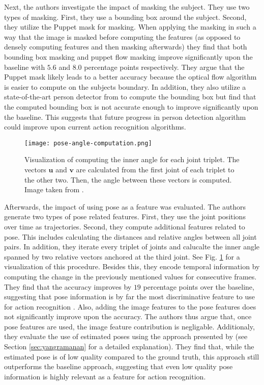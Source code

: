Next, the authors investigate the impact of masking the subject. 
They use two types of masking. First, they use a bounding box around the subject. Second, they utilize the Puppet mask for masking. 
When applying the masking in such a way that the image is masked before computing the features (as opposed to densely computing features and then masking afterwards) they find that both bounding box masking and puppet flow masking improve significantly upon the baseline with $5.6$ and $8.0$ percentage points respectively.
They argue that the Puppet mask likely leads to a better accuracy because the optical flow algorithm is easier to compute on the subjects boundary.
In addition, they also utilize a state-of-the-art person detector from \cite{bourdev_detecting_2010} to compute the bounding box but find that the computed bounding box is not accurate enough to improve significantly upon the baseline.
This suggests that future progress in person detection algorithm could improve upon current action recognition algorithms.

\begin{figure}[htb!]
    \centering
    \texttt{[image: pose-angle-computation.png]}
    \caption{Visualization of computing the inner angle for each joint triplet. The vectors $\bm{u}$ and $\bm{v}$ are calculated from the first joint of each triplet to the other two. Then, the angle between these vectors is computed. Image taken from \cite{jhuang_towards_2013}. }
    \label{fig:joint-angle-computation}
\end{figure}

Afterwards, the impact of using pose as a feature was evaluated.
The authors generate two types of pose related features. 
First, they use the joint positions over time as trajectories. 
Second, they compute additional features related to pose.
This includes calculating the distances and relative angles between all joint pairs. 
In addition, they iterate every triplet of joints and calucalte the inner angle spanned by two relative vectors anchored at the third joint.
See Fig. \ref{fig:joint-angle-computation} for a visualization of this procedure.
Besides this, they encode temporal information by computing the change in the previously mentioned values for consecutive frames.
They find that the accuracy improves by $19$ percentage points over the baseline, suggesting that pose information is by far the most discriminative feature to use for action recognition \cite{jhuang_towards_2013}. 
Also, adding the image features to the pose features does not significantly improve upon the accuracy. 
The authors thus argue that, once pose features are used, the image feature contribution is negligable.
Additionaly, they evaluate the use of estimated poses using the approach presented by \cite{yang_articulated_2011} (see Section \ref{sec:yangramanan} for a detailed explanation). 
They find that, while the estimated pose is of low quality compared to the ground truth, this approach still outperforms the baseline approach, suggesting that even low quality pose information is highly relevant as a feature for action recognition.


